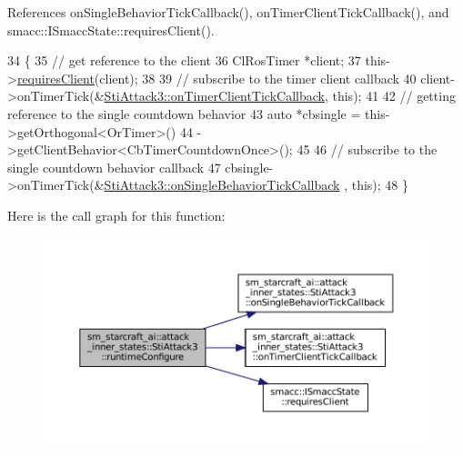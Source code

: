 References on\+Single\+Behavior\+Tick\+Callback(), on\+Timer\+Client\+Tick\+Callback(), and smacc\+::\+I\+Smacc\+State\+::requires\+Client().


\begin{DoxyCode}
34   \{
35     \textcolor{comment}{// get reference to the client}
36     ClRosTimer *client;
37     this->\hyperlink{classsmacc_1_1ISmaccState_a7f95c9f0a6ea2d6f18d1aec0519de4ac}{requiresClient}(client);
38 
39     \textcolor{comment}{// subscribe to the timer client callback}
40     client->onTimerTick(&\hyperlink{structsm__starcraft__ai_1_1attack__inner__states_1_1StiAttack3_afb25dc151281ba1422efe43a7d9e57d7}{StiAttack3::onTimerClientTickCallback}, \textcolor{keyword}{this});
41 
42     \textcolor{comment}{// getting reference to the single countdown behavior}
43     \textcolor{keyword}{auto} *cbsingle = this->getOrthogonal<OrTimer>()
44                           ->getClientBehavior<CbTimerCountdownOnce>();
45 
46     \textcolor{comment}{// subscribe to the single countdown behavior callback}
47     cbsingle->onTimerTick(&\hyperlink{structsm__starcraft__ai_1_1attack__inner__states_1_1StiAttack3_a22b5a550554194df779a60d68b101311}{StiAttack3::onSingleBehaviorTickCallback}
      , \textcolor{keyword}{this});
48   \}
\end{DoxyCode}
Here is the call graph for this function\+:
\nopagebreak
\begin{figure}[H]
\begin{center}
\leavevmode
\includegraphics[width=350pt]{structsm__starcraft__ai_1_1attack__inner__states_1_1StiAttack3_a540d7311712db7ce0310910de4b5cc31_cgraph}
\end{center}
\end{figure}
\mbox{\label{structsm__starcraft__ai_1_1attack__inner__states_1_1StiAttack3_a95e932b70e9a8de911ab0d6f74b567a5}} 
